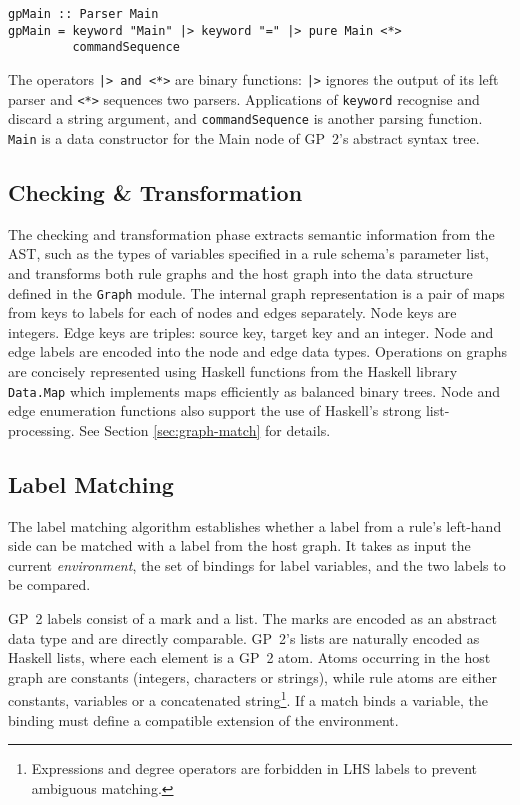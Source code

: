 \begin{verbatim}
gpMain :: Parser Main
gpMain = keyword "Main" |> keyword "=" |> pure Main <*> 
         commandSequence
\end{verbatim}

The operators \texttt{|> and <*>} are binary functions: \texttt{|>} ignores the output of its left parser and \texttt{<*>} sequences two parsers. Applications of \texttt{keyword} recognise and discard a string argument, and \texttt{commandSequence} is another parsing function. \texttt{Main} is a data constructor for the Main node of GP~2's abstract syntax tree.

\subsection{Checking \& Transformation}

The checking and transformation phase extracts semantic information from the AST, such as the types of variables specified in a rule schema's parameter list, and transforms both rule graphs and the host graph into the data structure defined in the \texttt{Graph} module. The internal graph representation is a pair of maps from keys to labels for each of nodes and edges separately. Node keys are integers. Edge keys are triples: source key, target key and an integer. Node and edge labels are encoded into the node and edge data types. Operations on graphs are concisely represented using Haskell functions from the Haskell library \texttt{Data.Map} which implements maps efficiently as balanced binary trees. Node and edge enumeration functions also support the use of Haskell's strong list-processing. See Section \ref{sec:graph-match} for details.

\subsection{Label Matching}
The label matching algorithm establishes whether a label from a rule's left-hand side can be matched with a label from the host graph. It takes as input the current \textit{environment}, the set of bindings for label variables, and the two labels to be compared. 

GP~2 labels consist of a mark and a list. The marks are encoded as an abstract data type and are directly comparable. GP~2's lists are naturally encoded as Haskell lists, where each element is a GP~2 atom. Atoms occurring in the host graph are constants (integers, characters or strings), while rule atoms are either constants, variables or a concatenated string\footnote{Expressions and degree operators are forbidden in LHS labels to prevent ambiguous matching.}. If a match binds a variable, the binding must define a compatible extension of the environment.

